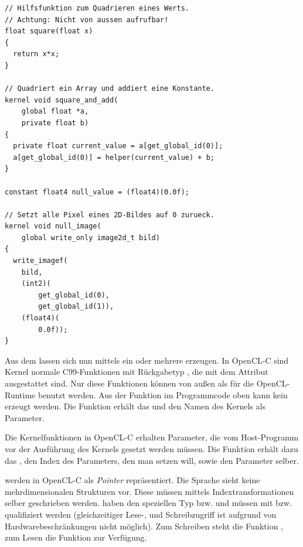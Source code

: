 \begin{verbatim}
// Hilfsfunktion zum Quadrieren eines Werts.
// Achtung: Nicht von aussen aufrufbar!
float square(float x)
{
  return x*x;
}

// Quadriert ein Array und addiert eine Konstante.
kernel void square_and_add(
    global float *a,
    private float b)
{
  private float current_value = a[get_global_id(0)];
  a[get_global_id(0)] = helper(current_value) + b;
}

constant float4 null_value = (float4)(0.0f);

// Setzt alle Pixel eines 2D-Bildes auf 0 zurueck.
kernel void null_image(
    global write_only image2d_t bild)
{
  write_imagef(
    bild,
    (int2)(
        get_global_id(0),
        get_global_id(1)),
    (float4)(
        0.0f));
}
\end{verbatim}

Aus dem  lassen sich nun mittels
 ein oder mehrere
 erzeugen. In OpenCL-C sind Kernel
normale C99-Funktionen mit Rückgabetyp , die
mit dem Attribut  ausgestattet sind. Nur
diese Funktionen können von außen als 
für die OpenCL-Runtime benutzt werden. Aus der Funktion
 im Programmcode oben kann \PimiddyzB{} kein
 erzeugt werden. Die Funktion
 erhält das  und den
Namen des Kernels als Parameter.

Die Kernelfunktionen in OpenCL-C erhalten Parameter, die vom
Host-Programm vor der Ausführung des Kernels gesetzt werden
müssen. Die Funktion  erhält dazu das
, den Index des Parameters, den man setzen will, sowie den
Parameter selber.

 werden in OpenCL-C als \emph{Pointer} repräsentiert. Die
Sprache sieht keine mehrdimensionalen Strukturen vor. Diese müssen
mittels Indextransformationen selber geschrieben werden. 
haben den speziellen Typ 
bzw.  und müssen mit
 bzw. 
qualifiziert werden (gleichzeitiger Lese-, und Schreibzugriff ist
aufgrund von Hardwarebeschränkungen nicht möglich). Zum Schreiben
steht die Funktion , zum Lesen die
Funktion  zur Verfügung.

